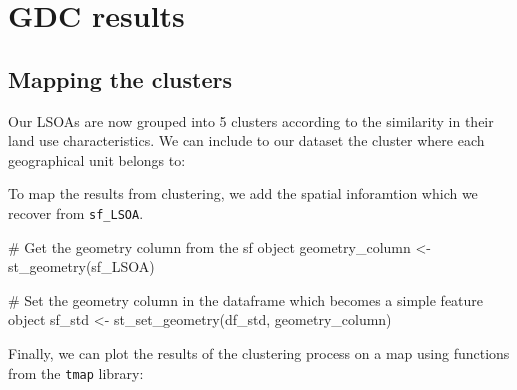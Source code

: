 \documentclass[
  letterpaper,
  DIV=11,
  numbers=noendperiod]{scrreprt}
\newenvironment{Shaded}{\begin{snugshade}}{\end{snugshade}}
\newcommand{\CommentTok}[1]{\textcolor[rgb]{0.37,0.37,0.37}{#1}}
\newcommand{\FunctionTok}[1]{\textcolor[rgb]{0.28,0.35,0.67}{#1}}
\newcommand{\NormalTok}[1]{\textcolor[rgb]{0.00,0.23,0.31}{#1}}
\newcommand{\OtherTok}[1]{\textcolor[rgb]{0.00,0.23,0.31}{#1}}
\newcommand{\SpecialCharTok}[1]{\textcolor[rgb]{0.37,0.37,0.37}{#1}}
\begin{document}
\hypertarget{sec-sec37}{%
\section{GDC results}\label{sec-sec37}}

\hypertarget{mapping-the-clusters}{%
\subsection{Mapping the clusters}\label{mapping-the-clusters}}

Our LSOAs are now grouped into 5 clusters according to the similarity in
their land use characteristics. We can include to our dataset the
cluster where each geographical unit belongs to:

\begin{Shaded}
\end{Shaded}

To map the results from clustering, we add the spatial inforamtion which
we recover from \texttt{sf\_LSOA}.

\begin{Shaded}
\begin{Highlighting}[]
\CommentTok{\# Get the geometry column from the sf object}
\NormalTok{geometry\_column }\OtherTok{\textless{}{-}} \FunctionTok{st\_geometry}\NormalTok{(sf\_LSOA)}

\CommentTok{\# Set the geometry column in the dataframe which becomes a simple feature object}
\NormalTok{sf\_std }\OtherTok{\textless{}{-}} \FunctionTok{st\_set\_geometry}\NormalTok{(df\_std, geometry\_column)}
\end{Highlighting}
\end{Shaded}

Finally, we can plot the results of the clustering process on a map
using functions from the \texttt{tmap} library:
\end{document}
